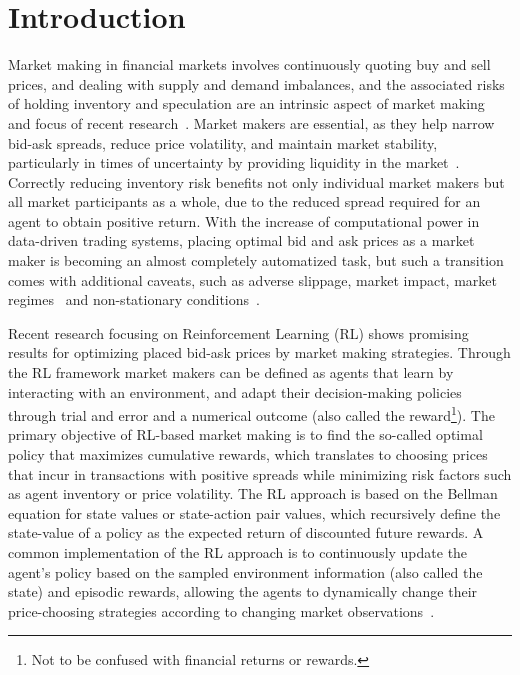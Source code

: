 \section{Introduction}
\label{sec:introduction}

Market making in financial markets involves continuously quoting buy and sell prices, and dealing with supply and demand imbalances,
and the associated risks of holding inventory and speculation are an intrinsic aspect of market making and focus of recent research~\cite{Cartea2015, Gasperov2021}.
Market makers are essential, as they help narrow bid-ask spreads, reduce price volatility, and maintain market stability,
particularly in times of uncertainty by providing liquidity in the market~\cite{Glosten1985, OHara1995}.
Correctly reducing inventory risk benefits not only individual market makers but all market participants as a whole,
due to the reduced spread required for an agent to obtain positive return.
With the increase of computational power in data-driven trading systems,
placing optimal bid and ask prices as a market maker is becoming an almost completely automatized task,
but such a transition comes with additional caveats, such as adverse slippage, market impact, market regimes~\cite{Cont2010, Bouchaud2018}
and non-stationary conditions~\cite{Gasperov2021}.

Recent research focusing on Reinforcement Learning (RL) shows promising results for optimizing placed bid-ask prices by market making strategies.
Through the RL framework market makers can be defined as agents that learn by interacting with an environment,
and adapt their decision-making policies through trial and error and a numerical outcome
(also called the reward\footnote{Not to be confused with financial returns or rewards.}).
The primary objective of RL-based market making is to find the so-called optimal policy that maximizes cumulative rewards,
which translates to choosing prices that incur in transactions with positive spreads while minimizing risk factors such as agent inventory or price volatility.
The RL approach is based on the Bellman equation for state values or state-action pair values,
which recursively define the state-value of a policy as the expected return of discounted future rewards.
A common implementation of the RL approach is to continuously update the agent's policy based on the sampled environment information (also called the state) and episodic rewards,
allowing the agents to dynamically change their price-choosing strategies according to changing market observations~\cite{Sutton2018}.

